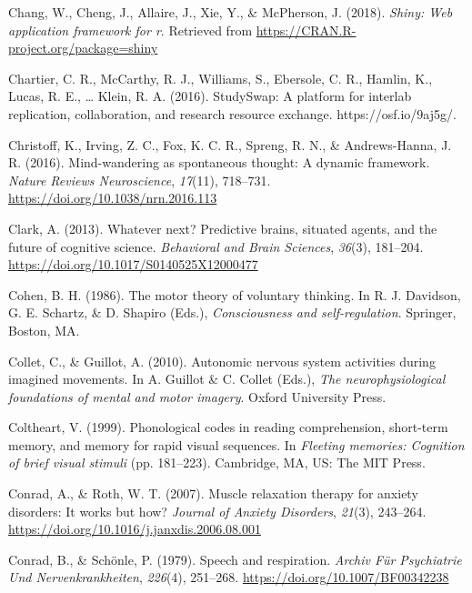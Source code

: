 \documentclass[a4paper,12pt,twoside,openright,oldfontcommands,final]{memoir}
\begin{document}
\leavevmode\hypertarget{ref-R-shiny}{}%
Chang, W., Cheng, J., Allaire, J., Xie, Y., \& McPherson, J. (2018). \emph{Shiny: Web application framework for r}. Retrieved from \url{https://CRAN.R-project.org/package=shiny}

\leavevmode\hypertarget{ref-chartier_studyswap_2016}{}%
Chartier, C. R., McCarthy, R. J., Williams, S., Ebersole, C. R., Hamlin, K., Lucas, R. E., \ldots{} Klein, R. A. (2016). StudySwap: A platform for interlab replication, collaboration, and research resource exchange. https://osf.io/9aj5g/.

\leavevmode\hypertarget{ref-christoff_mind-wandering_2016}{}%
Christoff, K., Irving, Z. C., Fox, K. C. R., Spreng, R. N., \& Andrews-Hanna, J. R. (2016). Mind-wandering as spontaneous thought: A dynamic framework. \emph{Nature Reviews Neuroscience}, \emph{17}(11), 718--731. \url{https://doi.org/10.1038/nrn.2016.113}

\leavevmode\hypertarget{ref-clark_whatever_2013}{}%
Clark, A. (2013). Whatever next? Predictive brains, situated agents, and the future of cognitive science. \emph{Behavioral and Brain Sciences}, \emph{36}(3), 181--204. \url{https://doi.org/10.1017/S0140525X12000477}

\leavevmode\hypertarget{ref-cohen_motor_1986}{}%
Cohen, B. H. (1986). The motor theory of voluntary thinking. In R. J. Davidson, G. E. Schartz, \& D. Shapiro (Eds.), \emph{Consciousness and self-regulation}. Springer, Boston, MA.

\leavevmode\hypertarget{ref-collet_autonomic_2010}{}%
Collet, C., \& Guillot, A. (2010). Autonomic nervous system activities during imagined movements. In A. Guillot \& C. Collet (Eds.), \emph{The neurophysiological foundations of mental and motor imagery}. Oxford University Press.

\leavevmode\hypertarget{ref-coltheart_phonological_1999}{}%
Coltheart, V. (1999). Phonological codes in reading comprehension, short-term memory, and memory for rapid visual sequences. In \emph{Fleeting memories: Cognition of brief visual stimuli} (pp. 181--223). Cambridge, MA, US: The MIT Press.

\leavevmode\hypertarget{ref-conrad_muscle_2007}{}%
Conrad, A., \& Roth, W. T. (2007). Muscle relaxation therapy for anxiety disorders: It works but how? \emph{Journal of Anxiety Disorders}, \emph{21}(3), 243--264. \url{https://doi.org/10.1016/j.janxdis.2006.08.001}

\leavevmode\hypertarget{ref-conrad_speech_1979}{}%
Conrad, B., \& Schönle, P. (1979). Speech and respiration. \emph{Archiv Für Psychiatrie Und Nervenkrankheiten}, \emph{226}(4), 251--268. \url{https://doi.org/10.1007/BF00342238}
\end{document}

